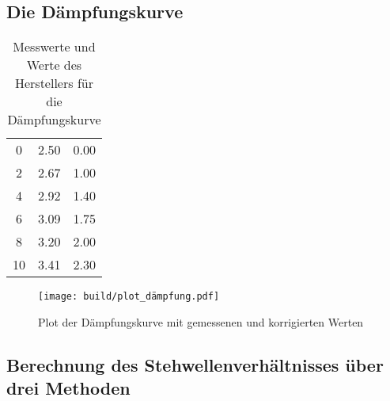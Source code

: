 \subsection{Die Dämpfungskurve}
\label{ssec:a3}

\begin{table}
    \centering
    \caption{Messwerte und Werte des Herstellers für die Dämpfungskurve}
    \label{tab:dämpfung}
    \begin{tabular}{S[table-format=1.0] S[table-format=1.2] S[table-format=1.2]}
        \toprule
         &  &  \\
         & 2.50 & 0.00\\
        2 & 2.67 & 1.00\\
        4 & 2.92 & 1.40\\
        6 & 3.09 & 1.75\\
        8 & 3.20 & 2.00\\
        10 & 3.41 & 2.30\\
        \bottomrule
    \end{tabular}
\end{table}

\begin{figure}
    \centering
    \texttt{[image: build/plot\_dämpfung.pdf]}
    \caption{Plot der Dämpfungskurve mit gemessenen und korrigierten Werten}
    \label{fig:dämpf_plot}
\end{figure}

\subsection{Berechnung des Stehwellenverhältnisses über drei Methoden}
\label{ssec:a5}